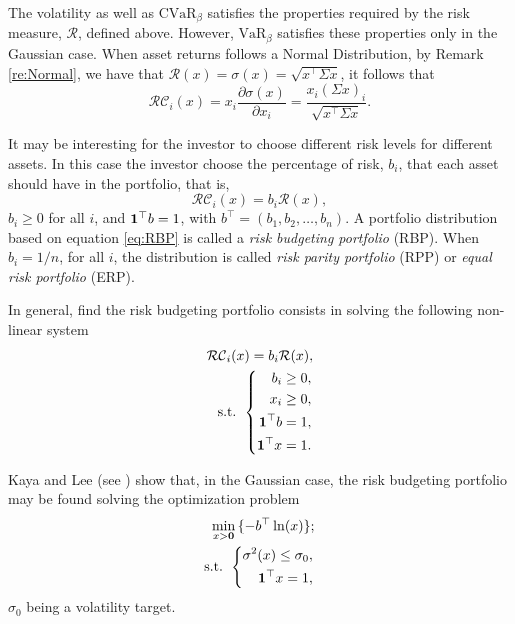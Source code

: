 The volatility as well as $\mbox{CVaR}_\beta$  satisfies the properties required by the risk measure, $\mathcal{R}$, defined above. However, $\mbox{VaR}_\beta$ satisfies these properties only in the Gaussian case. When asset returns follows a Normal Distribution, by Remark \ref{re:Normal}, we have that
$\mathcal{R}(x)=\sigma(x)=\sqrt{x^\top\Sigma x}$, it follows that
\[
	\mathcal{RC}_i(x)= x_i \frac{\partial \sigma(x)}{\partial x_i}=\frac{x_i (\Sigma x)_i}{\sqrt{x^\top\Sigma x }}.
\]

It may be interesting for the investor to choose different risk levels for different assets. In this case the investor choose the percentage of risk, $b_i$, that each asset should have in the portfolio, that is,
\begin{equation}\label{eq:RBP}
	\mathcal{RC}_i(x)=b_i\mathcal{R}(x),
\end{equation}
$b_i\geq 0$ for all $i$, and
${\bf 1}^\top b =1$, with $b^\top=(b_1, b_2, \dots, b_n)$. A portfolio distribution based on equation \eqref{eq:RBP} is called a \textit{risk budgeting portfolio} (RBP). When $b_i=1/n$, for all $i$, the distribution is called \textit{risk parity portfolio} (RPP) or \textit{equal risk portfolio} (ERP).

In general, find the risk budgeting portfolio consists in solving the following non-linear system
\begin{eqnarray*}
	\mathcal{RC}_i(x)=b_i\mathcal{R}(x), \\
	\mbox{s.t. }\left\{
	\begin{aligned}\nonumber
		b_i \geq 0,        \\
		x_i \geq 0,        \\
		{\bf 1}^\top b =1, \\
		{\bf 1}^\top x =1.
	\end{aligned}
	\right.
\end{eqnarray*}

Kaya and Lee (see \cite{KayaLee2012}) show that, in the Gaussian case, the risk budgeting portfolio may be found solving the optimization problem
\begin{eqnarray}
	\min_{x > \textbf{0}}\, \{-b^\top \ln(x)\}; \label{eq:RPP}\\
	\mbox{s.t. }\left\{ \nonumber
	\begin{aligned}\nonumber
		\sigma^2(x)\leq \sigma_0, \\
		{\bf 1}^\top x =1,
	\end{aligned}
	\right.
\end{eqnarray}
$\sigma_0$ being a volatility target.


